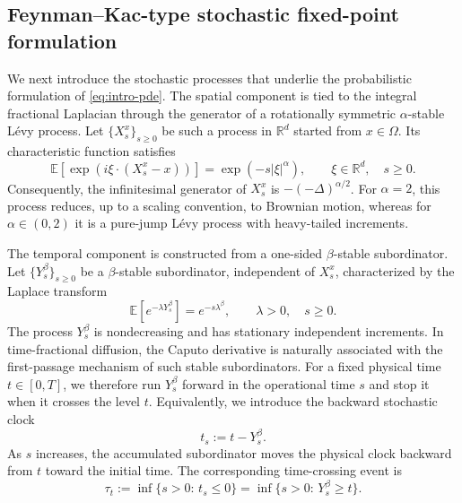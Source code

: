 \documentclass[a4paper,fleqn]{cas-sc}
\begin{document}
\subsection{Feynman--Kac-type stochastic fixed-point formulation}
\label{subsec:nonlinear-fk}
We next introduce the stochastic processes that underlie the probabilistic
formulation of \eqref{eq:intro-pde}. The spatial component is tied to the integral fractional Laplacian through the
generator of a rotationally symmetric $\alpha$-stable L\'evy process. Let
$\{X_s^x\}_{s\ge0}$ be such a process in $\mathbb{R}^d$ started from $x\in\Omega$.
Its characteristic function satisfies
\begin{equation}\label{eq:alpha-stable-char}
\mathbb{E}\!\left[
\exp\!\left(i\xi\cdot (X_s^x-x)\right)
\right]
=
\exp\!\left(-s|\xi|^\alpha\right),
\qquad
\xi\in\mathbb{R}^d,\quad s\ge0 .
\end{equation}
Consequently, the infinitesimal generator of $X_s^x$ is
$-(-\Delta)^{\alpha/2}$. For $\alpha=2$, this process reduces, up to a scaling
convention, to Brownian motion, whereas for $\alpha\in(0,2)$ it is a pure-jump
L\'evy process with heavy-tailed increments.

The temporal component is constructed from a one-sided $\beta$-stable
subordinator. Let $\{Y_s^\beta\}_{s\ge0}$ be a $\beta$-stable subordinator,
independent of $X_s^x$, characterized by the Laplace transform
\begin{equation}\label{eq:stable-laplace}
\mathbb{E}\!\left[e^{-\lambda Y_s^\beta}\right]
=
e^{-s\lambda^\beta},
\qquad
\lambda>0,\quad s\ge0 .
\end{equation}
The process $Y_s^\beta$ is nondecreasing and has stationary independent
increments. In time-fractional diffusion, the Caputo derivative is naturally
associated with the first-passage mechanism of such stable subordinators.
For a fixed physical time $t\in[0,T]$, we therefore run $Y_s^\beta$ forward in
the operational time $s$ and stop it when it crosses the level $t$. Equivalently,
we introduce the backward stochastic clock
\begin{equation}\label{eq:physical-clock}
t_s := t-Y_s^\beta .
\end{equation}
As $s$ increases, the accumulated subordinator moves the physical clock
backward from $t$ toward the initial time. The corresponding time-crossing
event is
\begin{equation}\label{eq:exit-time-fractional}
\tau_t
:=
\inf\{s>0:\,t_s\le0\}
=
\inf\{s>0:\,Y_s^\beta\ge t\}.
\end{equation}
\end{document}
